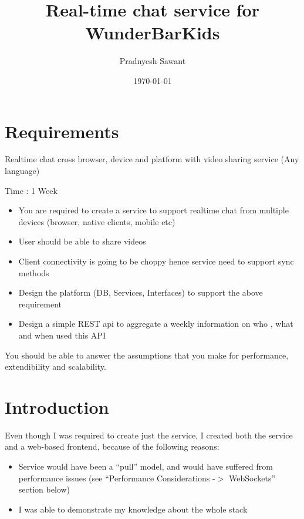 \documentclass[a4paper, 10pt]{article}
\title{Real-time chat service for WunderBarKids}
\author{Pradnyesh Sawant}
\date{\today}    \vspace{-\baselineskip}
\begin{document}
\maketitle
\thispagestyle{empty}   %



\section{Requirements}
Realtime chat cross browser, device and platform with video sharing service (Any language)

Time : 1 Week

\begin{itemize}
\item You are required to create a service to support realtime chat from multiple devices (browser, native clients, mobile etc)
\item User should be able to share videos
\item Client connectivity is going to be choppy hence service need to support sync methods
\item Design the platform (DB, Services, Interfaces) to support the above requirement
\item Design a simple REST api to aggregate a weekly information on who , what and when used this API
\end{itemize}

You should be able to answer the assumptions that you make for performance, extendibility and scalability.

\section{Introduction}
Even though I was required to create just the service, I created both the service and a web-based frontend, because of the following reasons:

\begin{itemize}
  \item Service would have been a ``pull'' model, and would have suffered from performance issues (see ``Performance Considerations -$>$ WebSockets'' section below)
  \item I was able to demonstrate my knowledge about the whole stack
\end{itemize}
\end{document}
